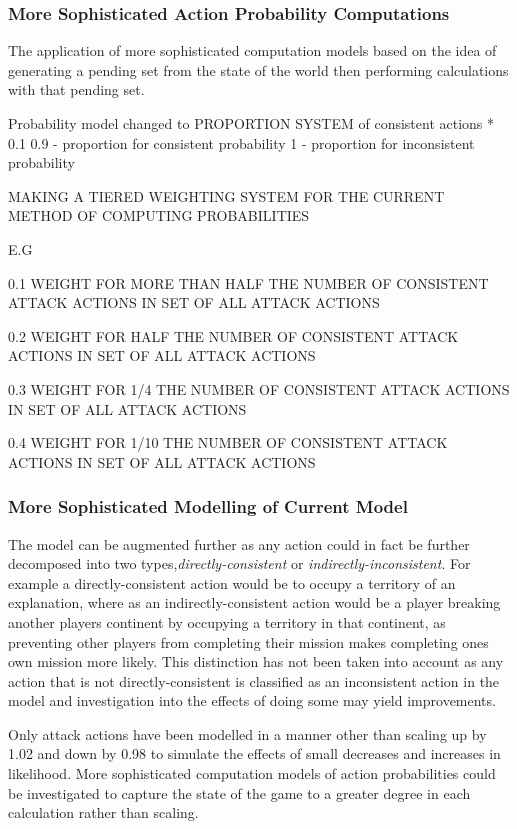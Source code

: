 \documentclass[parskip]{cs4rep}
\begin{document}
\subsubsection{More Sophisticated Action Probability Computations}

The application of more sophisticated computation models based on the idea of generating a pending set from the state of the world then performing calculations with that pending set.

Probability model changed to PROPORTION SYSTEM of consistent actions * 0.1 
0.9 - proportion for consistent probability
1 - proportion for inconsistent probability

MAKING A TIERED WEIGHTING SYSTEM FOR THE CURRENT METHOD OF COMPUTING PROBABILITIES

E.G 

0.1 WEIGHT FOR MORE THAN HALF THE NUMBER OF CONSISTENT ATTACK ACTIONS IN SET OF ALL ATTACK ACTIONS

0.2 WEIGHT FOR HALF THE NUMBER OF CONSISTENT ATTACK ACTIONS IN SET OF ALL ATTACK ACTIONS

0.3 WEIGHT FOR 1/4 THE NUMBER OF CONSISTENT ATTACK ACTIONS IN SET OF ALL ATTACK ACTIONS

0.4 WEIGHT FOR 1/10 THE NUMBER OF CONSISTENT ATTACK ACTIONS IN SET OF ALL ATTACK ACTIONS

\subsubsection{More Sophisticated Modelling of Current Model}

The model can be augmented further as any action could in fact be further decomposed into two types,\textit{directly-consistent} or \textit{indirectly-inconsistent}. For example a directly-consistent action would be to occupy a territory of an explanation, where as an indirectly-consistent action would be a player breaking another players continent by occupying a territory in that continent, as preventing other players from completing their mission makes completing ones own mission more likely. This distinction has not been taken into account as any action that is not directly-consistent is classified as an inconsistent action in the model and investigation into the effects of doing some may yield improvements.

Only attack actions have been modelled in a manner other than scaling up by 1.02 and down by 0.98 to simulate the effects of small decreases and increases in likelihood. More sophisticated computation models of action probabilities could be investigated to capture the state of the game to a greater degree in each calculation rather than scaling.
\end{document}
